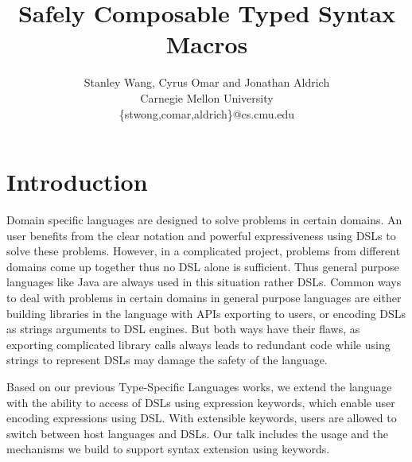 \documentclass[letterpaper, notitlepage]{article}
\begin{document}
\title{Safely Composable Typed Syntax Macros}
\author{Stanley Wang, Cyrus Omar and Jonathan Aldrich\\
Carnegie Mellon University\\
\{stwong,comar,aldrich\}@cs.cmu.edu}
\date{}
\maketitle

\section{Introduction}
Domain specific languages are designed to solve problems in certain domains. An user benefits from the clear notation and powerful expressiveness using DSLs to solve these problems. However, in a complicated project, problems from different domains come up together thus no DSL alone is sufficient. Thus general purpose languages like Java are always used in this situation rather DSLs. Common ways to deal with problems in certain domains in general purpose languages are either building libraries in the language with APIs exporting to users, or encoding DSLs as strings arguments to DSL engines. But both ways have their flaws, as exporting complicated library calls always leads to redundant code while using strings to represent DSLs may damage the safety of the language.
\par
Based on our previous Type-Specific Languages works, we extend the language with the ability to access of DSLs using expression keywords, which enable user encoding expressions using DSL. With extensible keywords, users are allowed to switch between host languages and DSLs. Our talk includes the usage and the mechanisms we build to support syntax extension using keywords.
\end{document}

